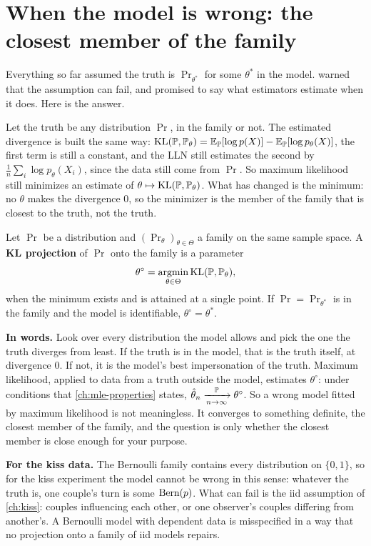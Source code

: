 \section{When the model is wrong: the closest member of the family}
\label{sec:dist-projection}

Everything so far assumed the truth is $\Pr_{\theta^*}$ for some $\theta^*$ in the model.
 warned that the assumption can fail, and promised to say what estimators estimate when it does.
Here is the answer.

Let the truth be any distribution $\Pr$, in the family or not.
The estimated divergence is built the same way: $\mathrm{KL}(\mathbb{P}, \mathbb{P}_\theta) = \operatorname*{\mathbb{E}}_{\mathbb{P}}[\log p(X)] - \operatorname*{\mathbb{E}}_{\mathbb{P}}[\log p_\theta(X)]$, the first term is still a constant, and the LLN still estimates the second by $\frac1n\sum_i \log p_\theta(X_i)$, since the data still come from $\Pr$.
So maximum likelihood still minimizes an estimate of $\theta \mapsto \mathrm{KL}(\mathbb{P}, \mathbb{P}_\theta)$.
What has changed is the minimum: no $\theta$ makes the divergence $0$, so the minimizer is the member of the family that is closest to the truth, not the truth.

\begin{definition}[KL projection]
\label{def:kl-projection}
Let $\Pr$ be a distribution and $(\Pr_\theta)_{\theta \in \Theta}$ a family on the same sample space.
A \textbf{KL projection} of $\Pr$ onto the family is a parameter
\[
\theta^\circ = \operatorname*{argmin}_{\theta \in \Theta} \mathrm{KL}(\mathbb{P}, \mathbb{P}_\theta),
\]
when the minimum exists and is attained at a single point.
If $\Pr = \Pr_{\theta^*}$ is in the family and the model is identifiable, $\theta^\circ = \theta^*$.
\end{definition}

\begin{inwords}
\textbf{In words.} Look over every distribution the model allows and pick the one the truth diverges from least. If the truth is in the model, that is the truth itself, at divergence $0$. If not, it is the model's best impersonation of the truth. Maximum likelihood, applied to data from a truth outside the model, estimates $\theta^\circ$: under conditions that \cref{ch:mle-properties} states, $\hat{\theta}_n \xrightarrow [n \to \infty ]{\mathbb{P}} \theta^\circ$. So a wrong model fitted by maximum likelihood is not meaningless. It converges to something definite, the closest member of the family, and the question is only whether the closest member is close enough for your purpose.
\par\smallskip
\textbf{For the kiss data.} The Bernoulli family contains every distribution on $\{0, 1\}$, so for the kiss experiment the model cannot be wrong in this sense: whatever the truth is, one couple's turn is some $\text{Bern}(p)$. What can fail is the iid assumption of \cref{ch:kiss}: couples influencing each other, or one observer's couples differing from another's. A Bernoulli model with dependent data is misspecified in a way that no projection onto a family of iid models repairs.
\end{inwords}

